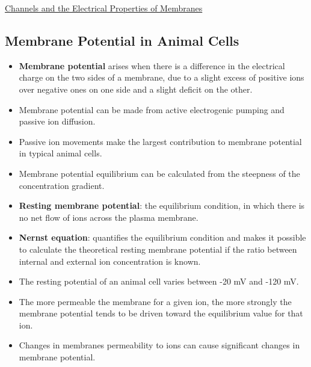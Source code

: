 \documentclass[12pt,letterpaper]{article}
\begin{document}
\begin{secbox}{\hyperlink{11}{Channels and the Electrical Properties of Membranes}}
{    \hypertarget{11.3.3}{\subsection*{Membrane Potential in Animal Cells}}
    \begin{itemize}
        \item \textbf{Membrane potential} arises when there is a difference in the electrical charge on the two sides of a membrane, due to a slight excess of positive ions over negative ones on one side and a slight deficit on the other. 
        \item Membrane potential can be made from active electrogenic pumping and passive ion diffusion.
        \item Passive ion movements make the largest contribution to membrane potential in typical animal cells.
        \item Membrane potential equilibrium can be calculated from the steepness of the  concentration gradient.
        \item \textbf{Resting membrane potential}: the equilibrium condition, in which there is no net flow of ions across the plasma membrane.
        \item \textbf{Nernst equation}: quantifies the equilibrium condition and makes it possible to calculate the theoretical resting membrane potential if the ratio between internal and external ion concentration is known.
        \item The resting potential of an animal cell varies between -20 mV and -120 mV.
        \item The more permeable the membrane for a given ion, the more strongly the membrane potential tends to be driven toward the equilibrium value for that ion. 
        \item Changes in membranes permeability to ions can cause significant changes in membrane potential. 
    \end{itemize}

}
\end{secbox}
\end{document}
